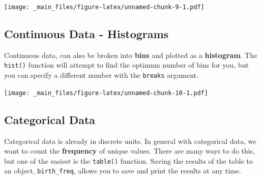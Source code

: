 \documentclass[
]{book}
\newenvironment{Shaded}{\begin{snugshade}}{\end{snugshade}}
\newcommand{\AttributeTok}[1]{\textcolor[rgb]{0.77,0.63,0.00}{#1}}
\newcommand{\FunctionTok}[1]{\textcolor[rgb]{0.00,0.00,0.00}{#1}}
\newcommand{\NormalTok}[1]{#1}
\newcommand{\OtherTok}[1]{\textcolor[rgb]{0.56,0.35,0.01}{#1}}
\newcommand{\SpecialCharTok}[1]{\textcolor[rgb]{0.00,0.00,0.00}{#1}}
\newcommand{\StringTok}[1]{\textcolor[rgb]{0.31,0.60,0.02}{#1}}
\begin{document}
\begin{Shaded}
\end{Shaded}

\texttt{[image: \_main\_files/figure-latex/unnamed-chunk-9-1.pdf]}

\hypertarget{continuous-data---histograms}{%
\subsection*{Continuous Data - Histograms}\label{continuous-data---histograms}}

Continuous data, can also be broken into \textbf{bins} and plotted as a \textbf{histogram}. The \texttt{hist()} function will attempt to find the optimum number of bins for you, but you can specify a different number with the \texttt{breaks} argument.

\begin{Shaded}
\end{Shaded}

\texttt{[image: \_main\_files/figure-latex/unnamed-chunk-10-1.pdf]}

\hypertarget{categorical-data}{%
\subsection*{Categorical Data}\label{categorical-data}}

Categorical data is already in discrete units. In general with categorical data, we want to count the \textbf{frequency} of unique values. There are many ways to do this, but one of the easiest is the \texttt{table()} function. Saving the results of the table to an object, \texttt{birth\_freq}, allows you to save and print the results at any time.

\begin{Shaded}
\end{Shaded}
\end{document}
